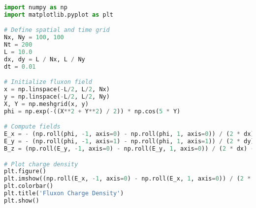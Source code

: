\documentclass{article}
\begin{document}
\begin{lstlisting}[language=Python, caption=Fluxonic Field Simulation]
import numpy as np
import matplotlib.pyplot as plt

# Define spatial and time grid
Nx, Ny = 100, 100
Nt = 200
L = 10.0
dx, dy = L / Nx, L / Ny
dt = 0.01

# Initialize fluxon field
x = np.linspace(-L/2, L/2, Nx)
y = np.linspace(-L/2, L/2, Ny)
X, Y = np.meshgrid(x, y)
phi = np.exp(-((X**2 + Y**2) / 2)) * np.cos(5 * Y)

# Compute fields
E_x = - (np.roll(phi, -1, axis=0) - np.roll(phi, 1, axis=0)) / (2 * dx)
E_y = - (np.roll(phi, -1, axis=1) - np.roll(phi, 1, axis=1)) / (2 * dy)
B_z = (np.roll(E_y, -1, axis=0) - np.roll(E_y, 1, axis=0)) / (2 * dx) - (np.roll(E_x, -1, axis=1) - np.roll(E_x, 1, axis=1)) / (2 * dy)

# Plot charge density
plt.figure()
plt.imshow((np.roll(E_x, -1, axis=0) - np.roll(E_x, 1, axis=0)) / (2 * dx) + (np.roll(E_y, -1, axis=1) - np.roll(E_y, 1, axis=1)) / (2 * dy), cmap='inferno')
plt.colorbar()
plt.title('Fluxon Charge Density')
plt.show()
\end{lstlisting}
\end{document}
